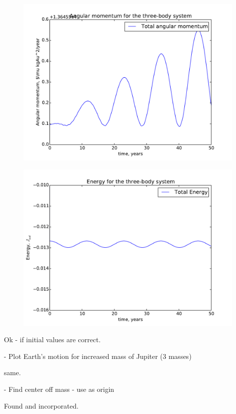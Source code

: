 \begin{figure}
	\centering
	\includegraphics[width=0.9\linewidth]{../results/plots/3bodyCentric_angular}
	\caption{}
	\label{fig:3bodycentricangular}
\end{figure}

\begin{figure}
	\centering
	\includegraphics[width=0.9\linewidth]{../results/plots/3bodyCentric_energy}
	\caption{}
	\label{fig:3bodycentricenergy}
\end{figure}


	Ok - if initial values are correct.
	
	- Plot Earth's motion for increased mass of Jupiter (3 masses)

	same.	
	
	- Find center off mass - use as origin

	Found and incorporated.	
	
